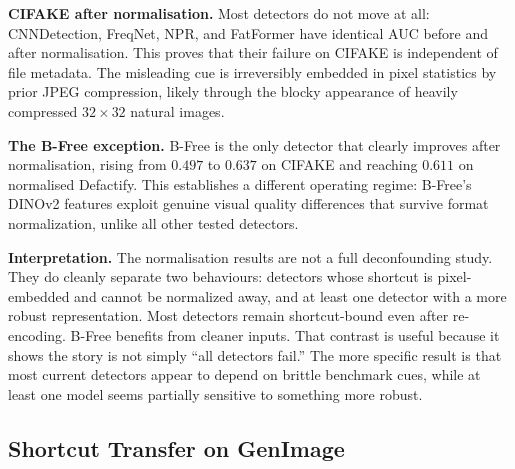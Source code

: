 \documentclass{bmvc2k}
\begin{document}
\noindent\textbf{CIFAKE after normalisation.}
Most detectors do not move at all: CNNDetection, FreqNet, NPR, and FatFormer have identical AUC before and after normalisation. This proves that their failure on CIFAKE is independent of file metadata. The misleading cue is irreversibly embedded in pixel statistics by prior JPEG compression, likely through the blocky appearance of heavily compressed $32\times32$ natural images.

\noindent\textbf{The B-Free exception.}
B-Free is the only detector that clearly improves after normalisation, rising from $0.497$ to $0.637$ on CIFAKE and reaching $0.611$ on normalised Defactify. This establishes a different operating regime: B-Free's DINOv2 features exploit genuine visual quality differences that survive format normalization, unlike all other tested detectors.

\noindent\textbf{Interpretation.}
The normalisation results are not a full deconfounding study. They do cleanly separate two behaviours: detectors whose shortcut is pixel-embedded and cannot be normalized away, and at least one detector with a more robust representation. Most detectors remain shortcut-bound even after re-encoding. B-Free benefits from cleaner inputs. That contrast is useful because it shows the story is not simply ``all detectors fail.'' The more specific result is that most current detectors appear to depend on brittle benchmark cues, while at least one model seems partially sensitive to something more robust.

\subsection{Shortcut Transfer on GenImage}
\label{sec:genimage_results}
\end{document}

